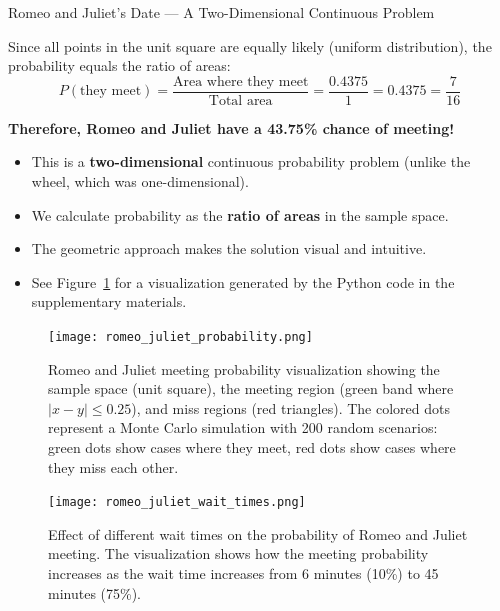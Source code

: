 \begin{exampleboxbreak}{Romeo and Juliet's Date — A Two-Dimensional Continuous Problem}

Since all points in the unit square are equally likely (uniform distribution), the probability equals the ratio of areas:
\[
P(\text{they meet}) = \frac{\text{Area where they meet}}{\text{Total area}} = \frac{0.4375}{1} = 0.4375 = \frac{7}{16}
\]

\textbf{Therefore, Romeo and Juliet have a 43.75\% chance of meeting!}


\begin{itemize}
    \item This is a \textbf{two-dimensional} continuous probability problem (unlike the wheel, which was one-dimensional).
    \item We calculate probability as the \textbf{ratio of areas} in the sample space.
    \item The geometric approach makes the solution visual and intuitive.
    \item See Figure~\ref{fig:romeo_juliet} for a visualization generated by the Python code in the supplementary materials.
\end{itemize}
\end{exampleboxbreak}

\begin{figure}[H]
    \centering
    \texttt{[image: romeo\_juliet\_probability.png]}
    \caption{Romeo and Juliet meeting probability visualization showing the sample space (unit square), the meeting region (green band where $|x-y| \leq 0.25$), and miss regions (red triangles). The colored dots represent a Monte Carlo simulation with 200 random scenarios: green dots show cases where they meet, red dots show cases where they miss each other.}
    \label{fig:romeo_juliet}
\end{figure}

\begin{figure}[H]
    \centering
    \texttt{[image: romeo\_juliet\_wait\_times.png]}
    \caption{Effect of different wait times on the probability of Romeo and Juliet meeting. The visualization shows how the meeting probability increases as the wait time increases from 6 minutes (10\%) to 45 minutes (75\%).}
    \label{fig:romeo_juliet_wait_times}
\end{figure}

